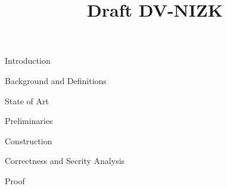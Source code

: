 



\pagestyle{plain}

\title{Draft DV-NIZK}

\maketitle

\begin{section}{Introduction}

\end{section}

\begin{section}{Background and Definitions}

\end{section}

\begin{section}{State of Art}

\end{section}

\begin{section}{Preliminaries}

\end{section}

\begin{section}{Construction}

\end{section}


\begin{section}{Correctness and Secrity Analysis}
  
\end{section}
\begin{section}{Proof}

\end{section}










